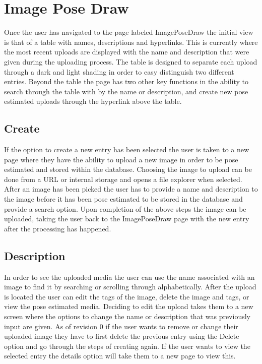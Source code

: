 \documentclass{scrreprt}
\begin{document}
\section{Image Pose Draw}
Once the user has navigated to the page labeled ImagePoseDraw the initial view is that of a table with names, descriptions and hyperlinks. This is currently where the most recent uploads are displayed with the name and description that were given during the uploading process. The table is designed to separate each upload through a dark and light shading in order to easy distinguish two different entries. Beyond the table the page has two other key functions in the ability to search through the table with by the name or description, and create new pose estimated uploads through the hyperlink above the table.

\subsection{Create}
If the option to create a new entry has been selected the user is taken to a new page where they have the ability to upload a new image in order to be pose estimated and stored within the database. Choosing the image to upload can be done from a URL or internal storage and opens a file explorer when selected. After an image has been picked the user has to provide a name and description to the image before it has been pose estimated to be stored in the database and provide a search option. Upon completion of the above steps the image can be uploaded, taking the user back to the ImagePoseDraw page with the new entry after the processing has happened.

\subsection{Description}
In order to see the uploaded media the user can use the name associated with an image to find it by searching or scrolling through alphabetically. After the upload is located the user can edit the tags of the image, delete the image and tags, or view the pose estimated media. Deciding to edit the upload takes them to a new screen where the options to change the name or description that was previously input are given. As of revision 0 if the user wants to remove or change their uploaded image they have to first delete the previous entry using the Delete option and go through the steps of creating again. If the user wants to view the selected entry the details option will take them to a new page to view this.
\end{document}
